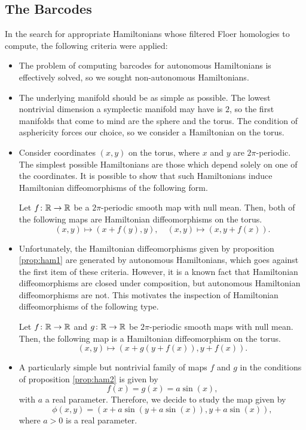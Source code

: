 \subsection{The Barcodes}

In the search for appropriate Hamiltonians whose filtered Floer homologies to compute, the following criteria were applied:
\begin{itemize}
\item The problem of computing barcodes for autonomous Hamiltonians is effectively solved, so we sought non-autonomous Hamiltonians.
\item The underlying manifold should be as simple as possible. The lowest nontrivial dimension a symplectic manifold may have is $2$, so the first manifolds that come to mind are the sphere and the torus. The condition of asphericity forces our choice, so we consider a Hamiltonian on the torus.
\item Consider coordinates $(x,y)$ on the torus, where $x$ and $y$ are $2\pi$-periodic. The simplest possible Hamiltonians are those which depend solely on one of the coordinates. It is possible to show that such Hamiltonians induce Hamiltonian diffeomorphisms of the following form.
\begin{prop}\label{prop:ham1}
Let $f \colon \mathbb{R} \to \mathbb{R}$ be a $2\pi$-periodic smooth map with null mean. Then, both of the following maps are Hamiltonian diffeomorphisms on the torus.
\begin{equation}
(x,y) \mapsto (x + f(y), y), \quad (x,y) \mapsto (x, y + f(x)).
\end{equation}
\end{prop}
\item Unfortunately, the Hamiltonian diffeomorphisms given by proposition \ref{prop:ham1} are generated by autonomous Hamiltonians, which goes against the first item of these criteria. However, it is a known fact that Hamiltonian diffeomorphisms are closed under composition, but autonomous Hamiltonian diffeomorphisms are not. This motivates the inspection of Hamiltonian diffeomorphisms of the following type.
\begin{prop}\label{prop:ham2}
Let $f \colon \mathbb{R} \to \mathbb{R}$ and $g \colon \mathbb{R} \to \mathbb{R}$ be $2\pi$-periodic smooth maps with null mean. Then, the following map is a Hamiltonian diffeomorphism on the torus.
\begin{equation}
(x,y) \mapsto (x + g(y + f(x)), y + f(x)).
\end{equation}
\end{prop}
\item A particularly simple but nontrivial family of maps $f$ and $g$ in the conditions of proposition \ref{prop:ham2} is given by
\begin{equation}
f(x) = g(x) = a \sin(x),
\end{equation}
with $a$ a real parameter. Therefore, we decide to study the map given by
\begin{equation}
\phi(x,y) = (x + a \sin(y + a \sin(x)), y + a \sin(x)),
\end{equation}
where $a > 0$ is a real parameter.
\end{itemize}

